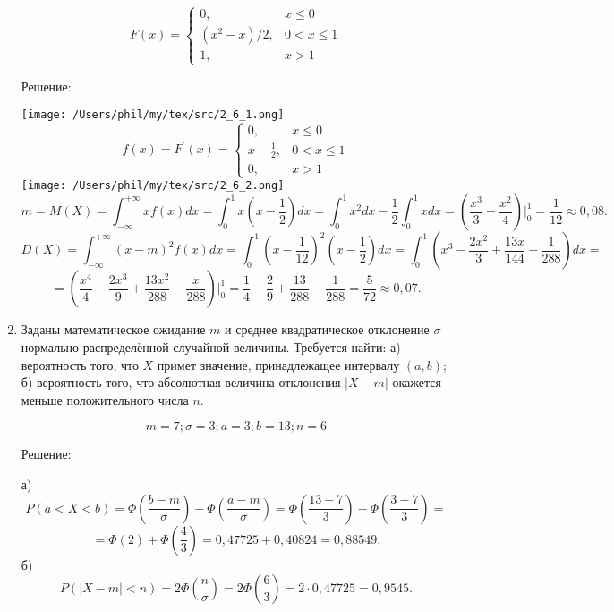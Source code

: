 \documentclass{article}
\renewcommand{\leq}{\ensuremath{\leqslant}}
\begin{document}
\begin{enumerate}
\begin{equation*}
F(x) =
 \begin{cases}
  0, & x\leq0\\
  (x^2-x)/2, & 0<x\leq1\\
  1, & x>1
 \end{cases}
\end{equation*}
\begin{center}Решение:\end{center}
\texttt{[image: /Users/phil/my/tex/src/2\_6\_1.png]}
\begin{equation*}
f(x) = F^{\prime}(x) =
 \begin{cases}
  0, & x\leq0\\
  x-\frac{1}{2}, & 0<x\leq1\\
  0, & x>1
 \end{cases}
\end{equation*}
\texttt{[image: /Users/phil/my/tex/src/2\_6\_2.png]}
$$m=M(X)=\int_{-\infty}^{+\infty} x f(x) dx=\int_{0}^{1} x\left(x-\frac{1}{2}\right) dx=\int_{0}^{1} x^2dx - \frac{1}{2}\int_{0}^{1} xdx=\left(\frac{x^3}{3}-\frac{x^2}{4}\right)\bigg|_{0}^{1}=\frac{1}{12}\approx0,08.$$
$$D(X)=\int_{-\infty}^{+\infty} (x-m)^2 f(x) dx=\int_{0}^{1} \left(x-\frac{1}{12}\right)^2\left(x-\frac{1}{2}\right) dx=\int_{0}^{1} \left(x^3-\frac{2x^2}{3}+\frac{13x}{144}-\frac{1}{288}\right) dx=$$
$$=\left(\frac{x^4}{4}-\frac{2x^3}{9}+\frac{13x^2}{288}-\frac{x}{288}\right)\bigg|_{0}^{1}=\frac{1}{4}-\frac{2}{9}+\frac{13}{288}-\frac{1}{288}=\frac{5}{72}\approx0,07.$$



\item %
Заданы математическое ожидание $m$ и среднее квадратическое отклонение $\sigma$ нормально распределённой случайной величины. \newline
Требуется найти: а) вероятность того, что $X$ примет значение, принадлежащее интервалу $(a, b)$; \newline
б) вероятность того, что абсолютная величина отклонения $|X-m|$ окажется меньше положительного числа $n$.

$$m=7;\sigma=3;a=3;b=13;n=6$$
\begin{center}Решение:\end{center}
а) $$P(a<X<b)=\Phi\left(\frac{b-m}{\sigma}\right)-\Phi\left(\frac{a-m}{\sigma}\right)=\Phi\left(\frac{13-7}{3}\right)-\Phi\left(\frac{3-7}{3}\right)=$$
$$=\Phi(2)+\Phi\left(\frac{4}{3}\right)=0,47725+0,40824=0,88549.$$
б)
$$P (|X-m| < n)= 2\Phi\left(\frac{n}{\sigma}\right)=2\Phi\left(\frac{6}{3}\right)=2\cdot0,47725=0,9545.$$


\end{enumerate}
\end{document}
